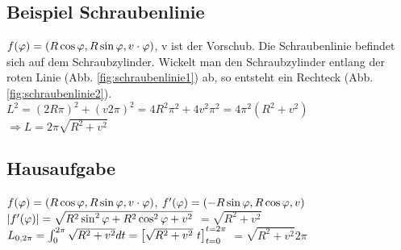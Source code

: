 \subsection{Beispiel Schraubenlinie}
$f(\varphi)= \left( R \cos \varphi, R \sin \varphi, v\cdot \varphi \right) $, v ist der Vorschub. Die Schraubenlinie befindet sich auf dem Schraubzylinder. Wickelt man den Schraubzylinder entlang der roten Linie (Abb. \ref{fig:schraubenlinie1}) ab, so entsteht ein Rechteck (Abb. \ref{fig:schraubenlinie2}). 
$L^2 = (2R\pi)^2 + (v2\pi)^2 = 4R^2 \pi^2 + 4v^2 \pi^2 = 4\pi^2(R^2+v^2)$
$\Rightarrow L=2\pi \sqrt{R^2 + v^2}$

\subsection{Hausaufgabe}
$f(\varphi)= \left( R \cos \varphi, R \sin \varphi, v\cdot \varphi \right) $, $f'(\varphi)= \left( -R \sin \varphi, R \cos \varphi, v \right) $\\
$ \left\vert f'(\varphi) \right\vert = \sqrt{R^2 \sin ^2 \varphi + R^2 \cos^2 \varphi + v^2}$
$= \sqrt{R^2 + v^2}$\\
$L_{0,2\pi}=\int_{0}^{2\pi} \sqrt{R^2 + v^2} dt =  \left[ \sqrt{R^2 + v^2} \ t \right] _{t=0}^{t=2\pi}$
\underline{$= \sqrt{R^2 + v^2} 2\pi$}
